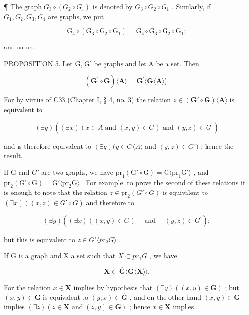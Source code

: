 ¶ The graph \(G_{3} \circ (G_{2} \circ G_{1})\) is denoted by \(G_{3} \circ G_{2} \circ G_{1}\) . Similarly, if \(G_{1}, G_{2}, G_{3}, G_{4}\) are graphs, we put

\[
\mathrm{G} _ {4} \circ (\mathrm{G} _ {3} \circ \mathrm{G} _ {2} \circ \mathrm{G} _ {1}) = \mathrm{G} _ {4} \circ \mathrm{G} _ {3} \circ \mathrm{G} _ {2} \circ \mathrm{G} _ {1};
\]

and so on.

PROPOSITION 5. Let G, G' be graphs and let A be a set. Then

\[
(\mathbf {G} ^ {\prime} \circ \mathbf {G}) \langle \mathbf {A} \rangle = \mathbf {G} ^ {\prime} \langle \mathbf {G} \langle \mathbf {A} \rangle \rangle .
\]

For by virtue of C33 (Chapter I, § 4, no. 3) the relation \(z \in (\mathbf{G}' \circ \mathbf{G})\langle \mathbf{A} \rangle\) is equivalent to

\[
(\exists y) ((\exists x) (x \in A \text {   and   } (x, y) \in G) \text {   and   } (y, z) \in G ^ {\prime})
\]

and is therefore equivalent to \((\exists y)(y \in G \langle A \rangle\) and \((y, z) \in G')\) ; hence the result.

If G and \(G'\) are two graphs, we have \(\mathrm{pr}_{1}(\mathrm{G}' \circ \mathrm{G}) = \mathrm{G}\langle\mathrm{pr}_{1}\mathrm{G}'\rangle\) , and \(\mathrm{pr}_{2}(\mathrm{G}' \circ \mathrm{G}) = \mathrm{G}'\langle\mathrm{pr}_{2}\mathrm{G}\rangle\) . For example, to prove the second of these relations it is enough to note that the relation \(z \in \mathrm{pr}_2(G' \circ G)\) is equivalent to \((\exists x)((x, z) \in G' \circ G)\) and therefore to

\[
(\exists y) ((\exists x) ((x, y) \in G) \quad \text { and } \quad (y, z) \in G ^ {\prime});
\]

but this is equivalent to \(z \in G' \langle pr_{2}G \rangle\) .

If G is a graph and X a set such that \(X \subset pr_{1}G\) , we have

\[
\mathbf {X} \subset \overline {{\mathbf {G}}} \langle \mathbf {G} \langle \mathbf {X} \rangle \rangle .
\]

For the relation \(x \in \mathbf{X}\) implies by hypothesis that \((\exists y)((x, y) \in \mathbf{G})\) ; but \((x, y) \in \mathbf{G}\) is equivalent to \((y, x) \in \overline{\mathbf{G}}\) , and on the other hand \((x, y) \in \mathbf{G}\) implies \((\exists z)(z \in \mathbf{X} \text{ and } (z, y) \in \mathbf{G})\) ; hence \(x \in \mathbf{X}\) implies

